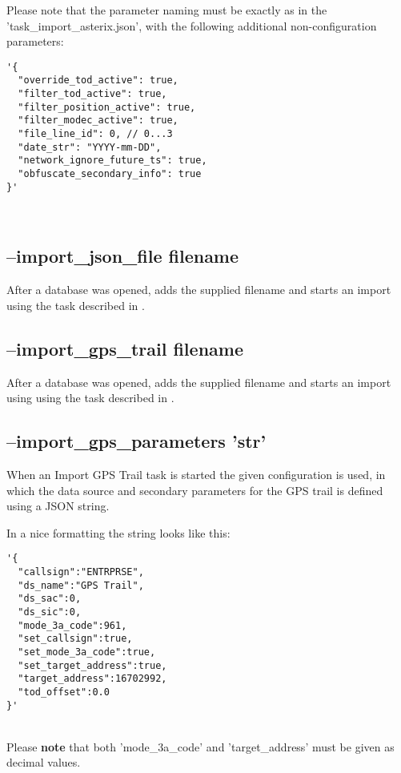 Please note that the parameter naming must be exactly as in the 'task\_import\_asterix.json', with the following additional non-configuration parameters:
\begin{lstlisting}[basicstyle=\small\ttfamily]
'{
  "override_tod_active": true,
  "filter_tod_active": true,
  "filter_position_active": true,
  "filter_modec_active": true,
  "file_line_id": 0, // 0...3
  "date_str": "YYYY-mm-DD",
  "network_ignore_future_ts": true,
  "obfuscate_secondary_info": true
}'
\end{lstlisting}
\ \\


\subsection{--import\_json\_file filename}

After a database was opened, adds the supplied filename and starts an import using the task described in .

\subsection{--import\_gps\_trail filename}

After a database was opened, adds the supplied filename and starts an import using using the task described in .

\subsection{--import\_gps\_parameters 'str'}

When an Import GPS Trail task is started the given configuration is used, in which the data source and secondary parameters for the GPS trail is defined using a JSON string.

In a nice formatting the string looks like this:
\begin{lstlisting}[basicstyle=\small\ttfamily]
'{
  "callsign":"ENTRPRSE",
  "ds_name":"GPS Trail",
  "ds_sac":0,
  "ds_sic":0,
  "mode_3a_code":961,
  "set_callsign":true,
  "set_mode_3a_code":true,
  "set_target_address":true,
  "target_address":16702992,
  "tod_offset":0.0
}'
\end{lstlisting}
\ \\

Please \textbf{note} that both 'mode\_3a\_code' and 'target\_address' must be given as decimal values.

